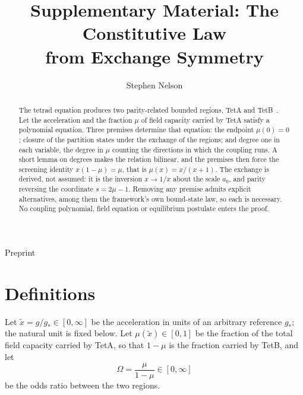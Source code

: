 \documentclass[twocolumn]{iopjournal}
\renewcommand{\articletype}[1]{%
  {\vspace*{-8mm}\noindent \Large \sf Preprint}\par
  \vspace*{6mm}\noindent{\scriptsize \sf{\bfseries \MakeUppercase{#1}}}}
\begin{document}
\articletype{Supplementary Material}

\title{Supplementary Material: The Constitutive Law\\
from Exchange Symmetry}

\author{Stephen Nelson}



\begin{abstract}
The tetrad equation produces two parity-related bounded regions,
TetA and TetB~\cite{Nelson2026geometry}. Let the acceleration and
the fraction $\mu$ of field capacity carried by TetA satisfy a
polynomial equation. Three premises determine that equation: the endpoint $\mu(0) = 0$; closure of the partition states
under the exchange of the regions; and degree one in each variable,
the degree in $\mu$ counting the directions in which the coupling
runs. A short lemma on degrees makes the relation bilinear, and the
premises then force the screening identity $x(1-\mu) = \mu$, that is
$\mu(x) = x/(x+1)$. The exchange is derived, not assumed: it is the
inversion $x \to 1/x$ about the scale $a_0$, and parity reversing the
coordinate $s = 2\mu - 1$. Removing any premise admits explicit
alternatives, among them the framework's own bound-state law, so each
is necessary. No coupling polynomial, field equation or equilibrium
postulate enters the proof.
\end{abstract}



\section*{Definitions}

Let $\tilde x = g/g_\ast \in [0,\infty]$ be the acceleration in units
of an arbitrary reference $g_\ast$; the natural unit is fixed below.
Let $\mu(\tilde x) \in [0,1]$ be the fraction of the total field
capacity carried by TetA, so that $1-\mu$ is the fraction carried by
TetB, and let
\begin{equation}
  \Omega = \frac{\mu}{1-\mu} \in [0,\infty]
  \label{eq:odds}
\end{equation}
be the odds ratio between the two regions.

\end{document}
